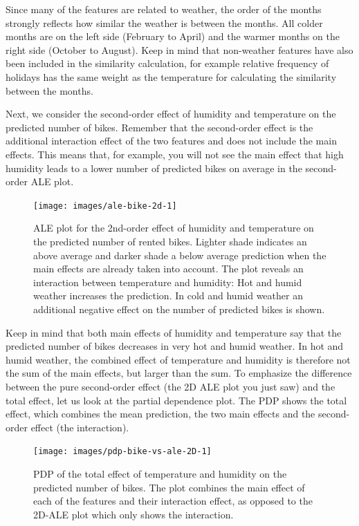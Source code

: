 \documentclass[
  12pt,
]{krantz}
\begin{document}
Since many of the features are related to weather, the order of the months strongly reflects how similar the weather is between the months.
All colder months are on the left side (February to April) and the warmer months on the right side (October to August).
Keep in mind that non-weather features have also been included in the similarity calculation, for example relative frequency of holidays has the same weight as the temperature for calculating the similarity between the months.

Next, we consider the second-order effect of humidity and temperature on the predicted number of bikes.
Remember that the second-order effect is the additional interaction effect of the two features and does not include the main effects.
This means that, for example, you will not see the main effect that high humidity leads to a lower number of predicted bikes on average in the second-order ALE plot.

\begin{figure}

{\centering \texttt{[image: images/ale-bike-2d-1]} 

}

\caption{ALE plot for the 2nd-order effect of humidity and temperature on the predicted number of rented bikes. Lighter shade indicates an above average and darker shade a below average prediction when the main effects are already taken into account. The plot reveals an interaction between temperature and humidity: Hot and humid weather increases the prediction. In cold and humid weather an additional negative effect on the number of predicted bikes is shown.}\label{fig:ale-bike-2d}
\end{figure}

Keep in mind that both main effects of humidity and temperature say that the predicted number of bikes decreases in very hot and humid weather.
In hot and humid weather, the combined effect of temperature and humidity is therefore not the sum of the main effects, but larger than the sum.
To emphasize the difference between the pure second-order effect (the 2D ALE plot you just saw) and the total effect, let us look at the partial dependence plot.
The PDP shows the total effect, which combines the mean prediction, the two main effects and the second-order effect (the interaction).

\begin{figure}

{\centering \texttt{[image: images/pdp-bike-vs-ale-2D-1]} 

}

\caption{PDP of the total effect of temperature and humidity on the predicted number of bikes. The plot combines the main effect of each of the features and their interaction effect, as opposed to the 2D-ALE plot which only shows the interaction.}\label{fig:pdp-bike-vs-ale-2D}
\end{figure}
\end{document}
